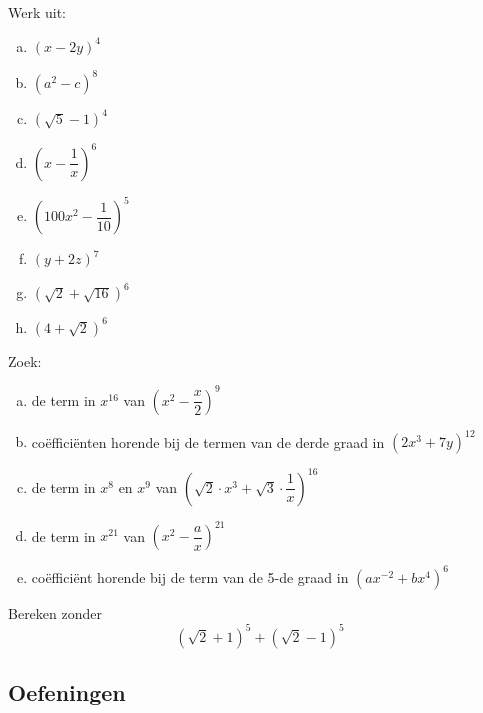 \documentclass[12pt,a4paper,twoside]{article}
\begin{document}
\begin{oefening}
Werk uit:
\begin{multicols}{3}
\begin{enumerate}[(a)]
  \item $\left(x-2y\right)^4$
  \item $\left(a^2-c\right)^8$
  \item $\left(\sqrt{5}-1\right)^4$
  \item $\left(x-\dfrac{1}{x}\right)^6$
  \item $\left(100x^2-\dfrac{1}{10}\right)^5$
  \item $\left(y+2z\right)^7$
  \item $\left(\sqrt{2}+\sqrt{16}\right)^6$
  \item $\left(4+\sqrt{2}\right)^6$
\end{enumerate}
\end{multicols}
\end{oefening}

\begin{oefening}
Zoek:
\begin{enumerate}[(a)]
  \itemsep.5em
  \item de term in $x^{16}$ van $\left(x^2-\dfrac{x}{2}\right)^9$
  \item coëfficiënten horende bij de termen van de derde graad in $\left(2x^3+7y\right)^{12}$
  \item de term in $x^{8}$ en $x^9$ van $\left(\sqrt{2}\cdot x^3+\sqrt{3}\cdot \dfrac{1}{x}\right)^{16}$
  \item de term in $x^{21}$ van $\left(x^2-\dfrac{a}{x}\right)^{21}$
  \item coëfficiënt horende bij de term van de 5-de graad in $\left(ax^{-2}+bx^4\right)^{6}$
\end{enumerate}
\end{oefening}

\begin{oefening}
Bereken zonder  $$\left(\sqrt{2}+1\right)^5+\left(\sqrt{2}-1\right)^5$$
\end{oefening}

\needspace{3cm}
\subsection{Oefeningen}  %
\end{document}
